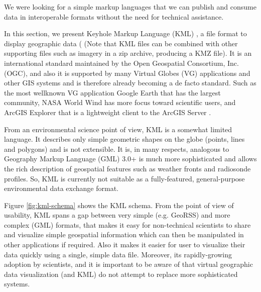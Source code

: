 We were looking for a simple markup languages that we can publish and consume data  in interoperable formats without the need for technical assistance.

In this section, we present Keyhole Markup Language (KML) \parencite{Google.kml.2016}, a file format to display geographic data ( (Note that KML files can be combined with other supporting files such as imagery in a zip archive, producing a KMZ file). It is an international standard maintained by the Open Geospatial Consortium, Inc. (OGC), and also it is supported by many Virtual Globes (VG) applications and other GIS systems and is therefore already becoming a de facto standard. Such as the most wellknown VG application Google Earth that has the largest community, NASA World Wind has more focus toward scientific users, and ArcGIS Explorer that is a lightweight client to the ArcGIS Server \parencite{blower.sharing-visualizing.2007}.

From an environmental science point of view, KML is a somewhat limited language. It describes only simple geometric shapes on the globe (points, lines and polygons) and is not extensible. It is, in many respects, analogous to Geography Markup Language (GML) 3.0+ is much more sophisticated and allows the rich description of geospatial features such as weather fronts and radiosonde profiles. So, KML is currently not suitable as a fully-featured, general-purpose environmental data exchange format.

Figure \ref{fig:kml-schema} shows the KML schema. From the point of view of usability, KML spans a gap between very simple (e.g. GeoRSS) and more complex (GML) formats, that makes it easy for non-technical scientists to share and visualize simple geospatial information which can then be manipulated in other applications if required. Also it makes it easier for user to visualize their data quickly using a single, simple data file. Moreover, its rapidly-growing adoption by scientists, and it is important to be aware of that virtual geographic data visualization (and KML) do not attempt to replace more sophisticated systems. 

